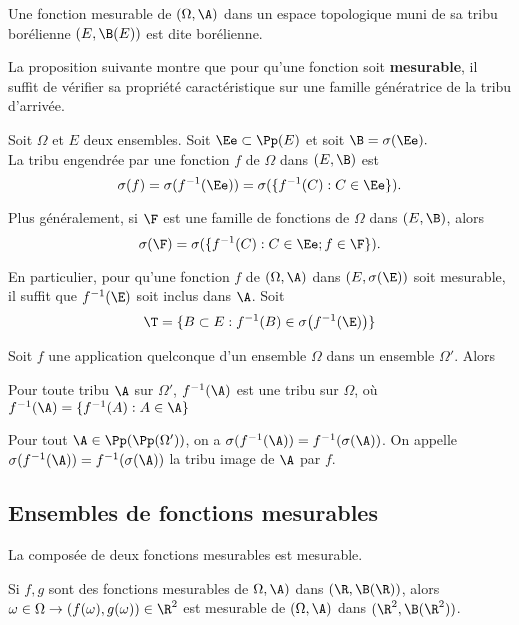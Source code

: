\bigskip

Une fonction mesurable de $(\Omega, \A)$ dans un espace topologique muni de sa tribu borélienne $(E, \B(E))$ est dite borélienne.
\ed
    
\bigskip

La proposition suivante montre que pour qu'une fonction soit \textbf{mesurable}, il suffit de vérifier sa propriété caractéristique sur une famille génératrice de la tribu d'arrivée.

 Soit $\Omega$ et $E$ deux ensembles. Soit $\Ee \subset \Pp(E)$ et soit $\B = \sigma(\Ee).$\\
La tribu engendrée par une fonction $f$ de $\Omega$ dans $(E, \B)$ est $$\sigma(f) = \sigma(f^{-1}(\Ee)) = \sigma(\{f^{-1}(C) : C \in \Ee\}).$$

Plus généralement, si $\F$ est une famille de fonctions de $\Omega$ dans $(E, \B)$, alors $$\sigma(\F) = \sigma(\{f^{-1}(C) : C \in \Ee ; f \in \F\}).$$

En particulier, pour qu'une fonction $f$ de $(\Omega, \A)$ dans $(E, \sigma(\E))$ soit mesurable, il suffit que $f^{-1}(\E)$ soit inclus dans $\A$.
\ep
 \bpf
 Soit $$\T = \{B \subset E : f^{-1}(B) \in \sigma\big(f^{-1}(\E)\big)\}$$
 \epf
    
Soit $f$ une application quelconque d'un ensemble $\Omega$ dans un ensemble $\Omega'$. Alors
\ben
    \item Pour toute tribu $\A$ sur $\Omega'$, $f^{-1}(\A)$ est une tribu sur $\Omega$, où $f^{-1}(\A) = \{f^{-1}(A) : A \in \A\}$
    \item Pour tout $\A \in \Pp(\Pp(\Omega'))$, on a $\sigma(f^{-1}(\A)) = f^{-1}(\sigma(\A))$.
\een
    On appelle $\sigma(f^{-1}(\A)) = f^{-1}(\sigma(\A))$ la tribu image de $\A$ par $f$.

\ep
\subsection{Ensembles de fonctions mesurables}

\bp
La composée de deux fonctions mesurables est mesurable.
\ep
\bpf

\epf
    
\bl
Si $f,g$ sont des fonctions mesurables de $\Omega, \A)$ dans $(\R, \B(\R))$, alors $\omega \in \Omega \to (f(\omega),g(\omega)) \in \R^2$ est mesurable de $(\Omega, \A)$ dans $(\R^2, \B(\R^2))$.
\el
\bpf
\epf

